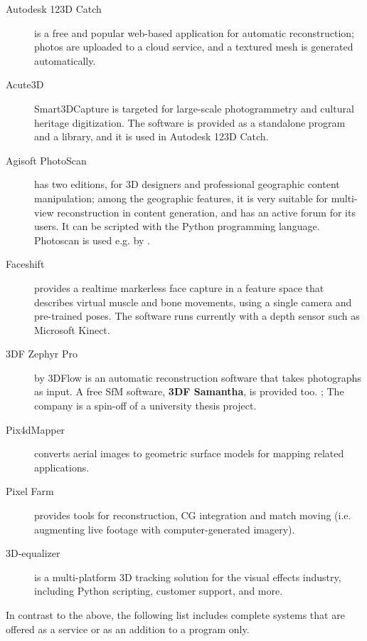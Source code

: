 \begin{description}
	\item[Autodesk 123D Catch] is a free and popular web-based application for automatic reconstruction; photos are uploaded to a cloud service, and a textured mesh is generated automatically. \cite{autodesk123dcatch}
	\item[Acute3D] Smart3DCapture is targeted for large-scale photogrammetry and cultural heritage digitization. The software is provided as a standalone program and a library, and it is used in Autodesk 123D Catch. \cite{acute3d}
	\item[Agisoft PhotoScan] has two editions, for 3D designers and professional geographic content manipulation; among the geographic features, it is very suitable for multi-view reconstruction in content generation, and has an active forum for its users. It can be scripted with the Python programming language. \cite{photoscan} Photoscan is used e.g. by \cite{ir-ltd}.
	\item[Faceshift] provides a realtime markerless face capture in a feature space that describes virtual muscle and bone movements, using a single camera and pre-trained poses. The software runs currently with a depth sensor such as Microsoft Kinect. \cite{faceshift}
	\item[3DF Zephyr Pro] by 3DFlow is an automatic reconstruction software that takes photographs as input. A free SfM software, \textbf{3DF Samantha}, is provided too. \cite{3dfzephyr}; The company is a spin-off of a university thesis project. \cite{toldo2013accurate,toldo2013towards}
	\item[Pix4dMapper] converts aerial images to geometric surface models for mapping related applications. \cite{pix4d}
	\item[Pixel Farm] provides tools for reconstruction, CG integration and match moving (i.e. augmenting live footage with computer-generated imagery). \cite{pixelfarm}
	\item[3D-equalizer] is a multi-platform 3D tracking solution for the visual effects industry, including Python scripting, customer support, and more. \cite{3dequalizer}
\end{description}

In contrast to the above, the following list includes complete systems that are offered as a service or as an addition to a program only.

